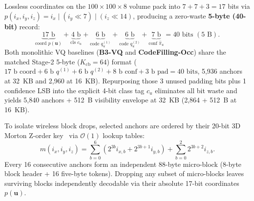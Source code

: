 \documentclass[journal]{IEEEtran}
\begin{document}
Lossless coordinates on the $100\times 100\times 8$ volume pack into $7 + 7 + 3 = 17$ bits via $p(i_x, i_y, i_z) = i_x \mid (i_y \ll 7) \mid (i_z \ll 14)$, producing a zero-waste \textbf{5-byte (40-bit)} record:
\begin{equation}
\underbrace{17\text{ b}}_{\text{coord } p(\mathbf{u})} + \underbrace{4\text{ b}}_{\text{cls } c_u} + \underbrace{6\text{ b}}_{\text{code } q_u^{(1)}} + \underbrace{6\text{ b}}_{\text{code } q_u^{(2)}} + \underbrace{7\text{ b}}_{\text{conf } \hat{\pi}_u} = 40\text{ bits } (5\text{ B}).
\label{eq:bitpack}
\end{equation}
Both monolithic VQ baselines (\textbf{B3-VQ} and \textbf{CodeFilling-Occ}) share the matched Stage-2 5-byte ($K_{\mathrm{cb}} = 64$) format ($17\text{ b coord} + 6\text{ b } q^{(1)} + 6\text{ b } q^{(2)} + 8\text{ b conf} + 3\text{ b pad} = 40\text{ bits}$, 5,936 anchors at 32~KB and 2,960 at 16~KB). Repurposing those 3 unused padding bits plus 1 confidence LSB into the explicit 4-bit class tag $c_u$ eliminates all bit waste and yields 5,840 anchors + 512~B visibility envelope at 32~KB (2,864 + 512~B at 16~KB).

To isolate wireless block drops, selected anchors are ordered by their 20-bit 3D Morton Z-order key~\cite{morton1966zorder} via $\mathcal{O}(1)$ lookup tables:
\begin{equation}
m(i_x, i_y, i_z) = \sum_{b=0}^{6} \left(2^{3b} i_{x,b} + 2^{3b+1} i_{y,b}\right) + \sum_{b=0}^{2} 2^{3b+2} i_{z,b}.
\label{eq:morton}
\end{equation}
Every 16 consecutive anchors form an independent 88-byte micro-block (8-byte block header + 16 five-byte tokens). Dropping any subset of micro-blocks leaves surviving blocks independently decodable via their absolute 17-bit coordinates $p(\mathbf{u})$.
\end{document}
